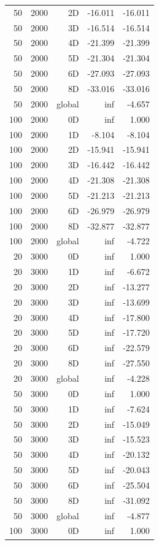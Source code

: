 \begin{longtable}{rrrrr}
50 & 2000 & 2D & -16.011 & -16.011 \\
50 & 2000 & 3D & -16.514 & -16.514 \\
50 & 2000 & 4D & -21.399 & -21.399 \\
50 & 2000 & 5D & -21.304 & -21.304 \\
50 & 2000 & 6D & -27.093 & -27.093 \\
50 & 2000 & 8D & -33.016 & -33.016 \\
50 & 2000 & global & inf & -4.657 \\
100 & 2000 & 0D & inf & 1.000 \\
100 & 2000 & 1D & -8.104 & -8.104 \\
100 & 2000 & 2D & -15.941 & -15.941 \\
100 & 2000 & 3D & -16.442 & -16.442 \\
100 & 2000 & 4D & -21.308 & -21.308 \\
100 & 2000 & 5D & -21.213 & -21.213 \\
100 & 2000 & 6D & -26.979 & -26.979 \\
100 & 2000 & 8D & -32.877 & -32.877 \\
100 & 2000 & global & inf & -4.722 \\
20 & 3000 & 0D & inf & 1.000 \\
20 & 3000 & 1D & inf & -6.672 \\
20 & 3000 & 2D & inf & -13.277 \\
20 & 3000 & 3D & inf & -13.699 \\
20 & 3000 & 4D & inf & -17.800 \\
20 & 3000 & 5D & inf & -17.720 \\
20 & 3000 & 6D & inf & -22.579 \\
20 & 3000 & 8D & inf & -27.550 \\
20 & 3000 & global & inf & -4.228 \\
50 & 3000 & 0D & inf & 1.000 \\
50 & 3000 & 1D & inf & -7.624 \\
50 & 3000 & 2D & inf & -15.049 \\
50 & 3000 & 3D & inf & -15.523 \\
50 & 3000 & 4D & inf & -20.132 \\
50 & 3000 & 5D & inf & -20.043 \\
50 & 3000 & 6D & inf & -25.504 \\
50 & 3000 & 8D & inf & -31.092 \\
50 & 3000 & global & inf & -4.877 \\
100 & 3000 & 0D & inf & 1.000 \\

\end{longtable}
